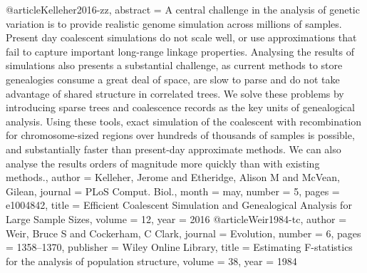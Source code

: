 @article{Kelleher2016-zz,
abstract = {A central challenge in the analysis of genetic variation is to
provide realistic genome simulation across millions of samples.
Present day coalescent simulations do not scale well, or use
approximations that fail to capture important long-range linkage
properties. Analysing the results of simulations also presents a
substantial challenge, as current methods to store genealogies
consume a great deal of space, are slow to parse and do not take
advantage of shared structure in correlated trees. We solve these
problems by introducing sparse trees and coalescence records as
the key units of genealogical analysis. Using these tools, exact
simulation of the coalescent with recombination for
chromosome-sized regions over hundreds of thousands of samples is
possible, and substantially faster than present-day approximate
methods. We can also analyse the results orders of magnitude more
quickly than with existing methods.},
author = {Kelleher, Jerome and Etheridge, Alison M and McVean, Gilean},
journal = {PLoS Comput. Biol.},
month = {may},
number = {5},
pages = {e1004842},
title = {{Efficient Coalescent Simulation and Genealogical Analysis for Large Sample Sizes}},
volume = {12},
year = {2016}
}
@article{Weir1984-tc,
author = {Weir, Bruce S and Cockerham, C Clark},
journal = {Evolution},
number = {6},
pages = {1358--1370},
publisher = {Wiley Online Library},
title = {{Estimating F-statistics for the analysis of population structure}},
volume = {38},
year = {1984}
}
